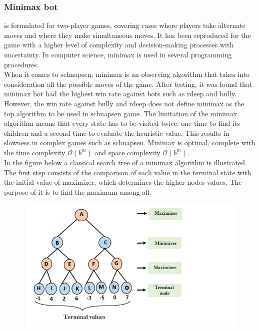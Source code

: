 \documentclass[master]{subfiles}
\begin{document}
\subsubsection{Minimax bot}
is formulated for two-player games, covering cases where players take alternate moves and where they make simultaneous moves. It has been reproduced for the game with a higher level of complexity and decision-making processes with uncertainty. In computer science, minimax is used in several programming procedures. \\
When it comes to schnapsen, minimax is an observing algorithm that takes into consideration all the possible moves of the game. After testing, it was found that minimax bot had the highest win rate against bots such as rdeep and bully. However, the win rate against bully and rdeep does not define minimax as the top algorithm to be used in schnapsen game. The limitation of the minimax algorithm means that every state has to be visited twice: one time to find its children and a second time to evaluate the heuristic value. This results in slowness in complex games such as schnapsen. Minimax is optimal, complete with the time complexity $\mathcal{O}(b^{m})$ and space complexity $\mathcal{O}(b^{m})$. \\
In the figure below a classical search tree of a minimax algorithm is illustrated. The first step consists of the comparison of each value in the terminal state with the initial value of maximizer, which determines the higher nodes values. The purpose of it is to find the maximum among all.
\begin{figure}
\centering
\hspace*{40pt}
\includegraphics[width=\textwidth]{images/minimax.png}
\label{minimax}
\end{figure}
\end{document}
